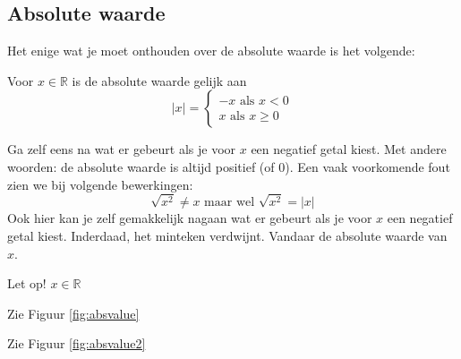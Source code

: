 \subsection{Absolute waarde}
Het enige wat je moet onthouden over de absolute waarde is het volgende:

\begin{definitie}
	Voor $x \in \mathbb{R}$ is de absolute waarde gelijk aan 
	\begin{equation*}
	|x| = \begin{cases}
	-x \text{ als } x<0 \\
	x \text{ als } x\ge 0 
	\end{cases}
	\end{equation*}
\end{definitie}

Ga zelf eens na wat er gebeurt als je voor $x$ een negatief getal kiest.
Met andere woorden: de absolute waarde is altijd positief (of 0).
Een vaak voorkomende fout zien we bij volgende bewerkingen:
\begin{equation*}
\sqrt{x^2}\ne x \text{ maar wel } \sqrt{x^2}=|x|
\end{equation*}
Ook hier kan je zelf gemakkelijk nagaan wat er gebeurt als je voor $x$ een negatief getal kiest. Inderdaad, het minteken verdwijnt. Vandaar de absolute waarde van $x$.

\begin{opmerking}
Let op! $x \in \mathbb{R}$	
\end{opmerking}

\begin{voorbeeld}
Zie Figuur \ref{fig:absvalue}

%
\end{voorbeeld}

\begin{voorbeeld}
	Zie Figuur \ref{fig:absvalue2}	
\end{voorbeeld}

